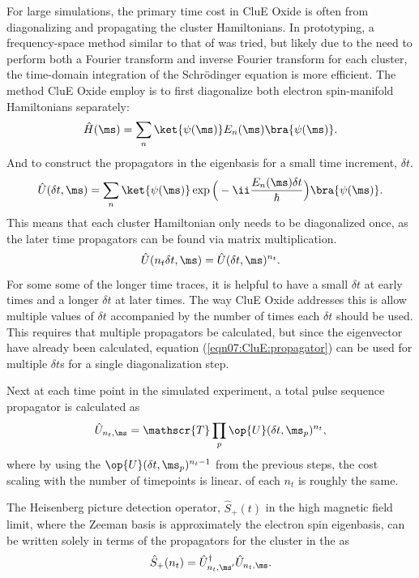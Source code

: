 \documentclass{book}
\begin{document}
For large simulations, the primary time cost in CluE Oxide is often from 
diagonalizing and propagating the cluster Hamiltonians.  
In prototyping, a frequency-space method similar to that of \cite{2009_Stoll}
was tried, but likely due to the need to perform both 
a Fourier transform and inverse Fourier transform for each cluster, 
the time-domain integration of the Schr{\"o}dinger equation is more efficient.
The method CluE Oxide employ is to first diagonalize both
electron spin-manifold Hamiltonians separately:
%
\begin{equation}
\hat{H}(\ms) 
= 
\sum_{n } 
\ket{\psi(\ms)}
E_n(\ms)
\bra{\psi(\ms)}
.
\end{equation}
% 
And to construct the propagators in the eigenbasis for a small time increment,
$\delta t$.
%
\begin{equation} \label{eqn07:CluE:propagator}
\hat{U}(\delta t, \ms) 
= 
\sum_{n } 
\ket{\psi(\ms)}
\exp \Big(-\ii \frac{E_n(\ms)  \delta t }{\hbar} \Big)
\bra{\psi(\ms)}
.
\end{equation}
% 
This means that each cluster Hamiltonian only needs to be diagonalized once, 
as the later time propagators can be found via matrix multiplication. 
%
\begin{equation}
\hat{U}(n_t \delta t, \ms) = 
\hat{U}(\delta t, \ms)^{n_t}. 
\end{equation}
%
For some some of the longer time traces, it is helpful to have a small 
$\delta t$ at early times and a longer $\delta t$ at later times.  
The way CluE Oxide addresses this is allow multiple values of $\delta t$ 
accompanied by the number of times each $\delta t$ should be used.  
This requires that multiple propagators be calculated, 
but since the eigenvector have already been
calculated, equation (\ref{eqn07:CluE:propagator}) can be used for multiple
$\delta t$s for a single diagonalization step.

Next at each time point in the simulated experiment, a total  pulse sequence
propagator is calculated as
%
\begin{equation}
\hat{U}_{n_t,\ms} = 
\mathscr{T} \prod_{p} \op{U}(\delta t, {\ms}_p)^{n_t}
,
\end{equation}
%
where by using the $\op{U}(\delta t, {\ms}_p)^{n_t-1}$ from the
previous steps, the cost scaling with the number of timepoints is linear. 
of each $n_t$ is roughly the same. 

The Heisenberg picture detection operator, $\hat{S}_{+}(t)$ in the high 
magnetic field limit, where the Zeeman basis is approximately the electron
spin eigenbasis, can be written solely in terms of the propagators for the
cluster in the as
%
\begin{equation}
\hat{S}_+(n_t) = 
\hat{U}_{n_t,\ms'}^{\dagger} \hat{U}_{n_t,\ms}  
.
\end{equation}
%
\end{document}

